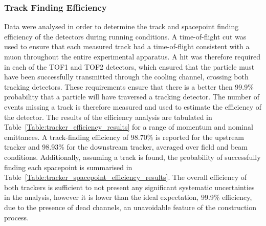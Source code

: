 \subsubsection{Track Finding Efficiency}
\label{trackers:performance:efficiency}
Data were analysed in order to determine the track and spacepoint finding efficiency of the detectors during running conditions. A time-of-flight cut was used to ensure that each measured track had a time-of-flight consistent with a muon throughout the entire experimental apparatus. A hit was therefore required in each of the TOF1 and TOF2 detectors, which ensured that the particle must have been successfully transmitted through the cooling channel, crossing both tracking detectors. These requirements ensure that there is a better then 99.9\% probability that a particle will have traversed a tracking detector.
The number of events missing a track is therefore measured and used to estimate the efficiency of the detector.
The results of the efficiency analysis are tabulated in Table~\ref{Table:tracker_efficiency_results} for a range of momentum and nominal emittances. A track-finding efficiency of 98.70\% is reported for the upstream tracker and 98.93\% for the downstream tracker, averaged over field and beam conditions. Additionally, assuming a track is found, the probability of successfully finding each spacepoint is summarised in Table~\ref{Table:tracker_spacepoint_efficiency_results}. The overall efficiency of both trackers is sufficient to not present any significant systematic uncertainties in the analysis, however it is lower than the ideal expectation, 99.9\% efficiency, due to the presence of dead channels, an unavoidable feature of the construction process.

